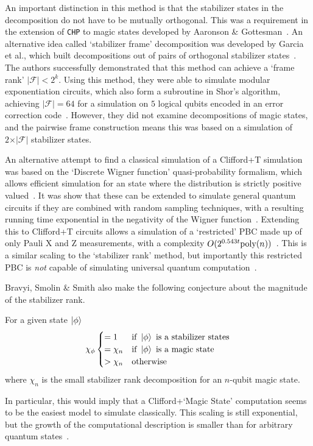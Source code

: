 \documentclass{standalone}
\begin{document}
\par
An important distinction in this method is that the stabilizer states in the decomposition do not have to be mutually orthogonal. This was a requirement in the extension of \texttt{CHP} to magic states developed by Aaronson \& Gottesman~\cite{Aaronson2004a,Garcia2012}. An alternative idea called `stabilizer frame' decomposition was developed by Garcia et al., which built decompositions out of pairs of orthogonal stabilizer states~\cite{Garcia2012,Garcia2015}.\\
The authors successfully demonstrated that this method can achieve a `frame rank' $\vert\mathcal{F}\vert < 2^{k}$. Using this method, they were able to simulate modular exponentiation circuits, which also form a subroutine in Shor's algorithm, achieving $\vert\mathcal{F}\vert=64$ for a simulation on $5$ logical qubits encoded in an error correction code~\cite{Garcia2015}. However, they did not examine decompositions of magic states, and the pairwise frame construction means this was based on a simulation of $2\times\vert\mathcal{F}\vert$ stabilizer states.
\par
An alternative attempt to find a classical simulation of a Clifford+T simulation was based on the `Discrete Wigner function' quasi-probability formalism, which allows efficient simulation for an state where the distribution is strictly positive valued~\cite{Veitch2012,Howard2014}. It was show that these can be extended to simulate general quantum circuits if they are combined with random sampling techniques, with a resulting running time exponential in the negativity of the Wigner function~\cite{Bravyi2015,Pashayan2015}. Extending this to Clifford+T circuits allows a simulation of a `restricted' PBC made up of only Pauli X and Z measurements, with a complexity $O(2^{0.543 t}\text{poly}(n))$~\cite{Bravyi2015,Delfosse2015}. This is a similar scaling to the `stabilizer rank' method, but importantly this restricted PBC is \emph{not} capable of simulating universal quantum computation~\cite{Bravyi2015}.
\par
Bravyi, Smolin \& Smith also make the following conjecture about the magnitude of the stabilizer rank.\\
\begin{conj}\label{thm:magicrank}
    For a given state $\ket{\phi}$
    \[\chi_{\phi} 
        \begin{cases}
            = 1 & \text{if } \ket{\phi} \text{ is a stabilizer states} \\
            = \chi_{n} & \text{if } \ket{\phi} \text{ is a magic state} \\
            > \chi_{n} & \text{otherwise} \\
        \end{cases}
    \]
    where $\chi_{n}$ is the small stabilizer rank decomposition for an $n$-qubit magic state.
\end{conj}
In particular, this would imply that a Clifford+`Magic State' computation seems to be the easiest model to simulate classically. This scaling is still exponential, but the growth of the computational description is smaller than for arbitrary quantum states~\cite{Bravyi2015}. 
\end{document}
